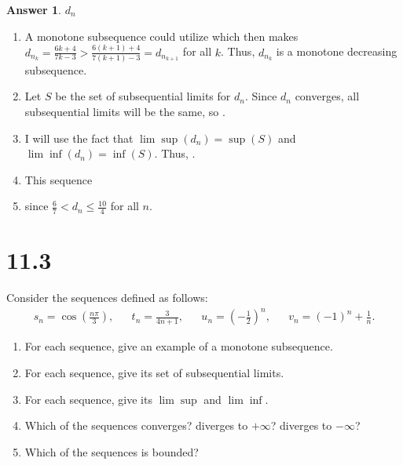 \documentclass[10pt,a4paper]{article}
\theoremstyle{definition}
\newtheorem*{answer*}{Answer}
\begin{document}
\begin{answer*}{$d_n$}
\begin{enumerate}[label = (\alph*)]
\item A monotone subsequence could utilize  which then makes $d_{n_k} = \frac{6k + 4}{7k - 3} > \frac{6(k+1) + 4}{7(k + 1) - 3} = d_{n_{k+1}}$ for all $k$. Thus, $d_{n_k}$ is a monotone decreasing subsequence.
\item Let $S$ be the set of subsequential limits for $d_n$. Since $d_n$ converges, all subsequential limits will be the same, so .
\item I will use the fact that $\lim \sup(d_n) = \sup(S)$ and $\lim \inf(d_n) = \inf(S)$. Thus, .
\item This sequence 
\item {} since $\frac{6}{7} < d_n \leq \frac{10}{4}$ for all $n$.
\end{enumerate}
\end{answer*}



\section*{11.3}
Consider the sequences defined as follows:
\begin{align*}
s_n = \cos\left(\frac{n\pi}{3}\right), && t_n = \frac{3}{4n + 1}, && u_n = \left(-\frac{1}{2}\right)^n, && v_n = (-1)^n + \frac{1}{n}.
\end{align*}
\begin{enumerate}[label = (\alph*)]
\item For each sequence, give an example of a monotone subsequence.
\item For each sequence, give its set of subsequential limits.
\item For each sequence, give its $\lim \sup$ and $\lim \inf$.
\item Which of the sequences converges? diverges to $+\infty$? diverges to $-\infty$?
\item Which of the sequences is bounded?
\end{enumerate}
\end{document}
